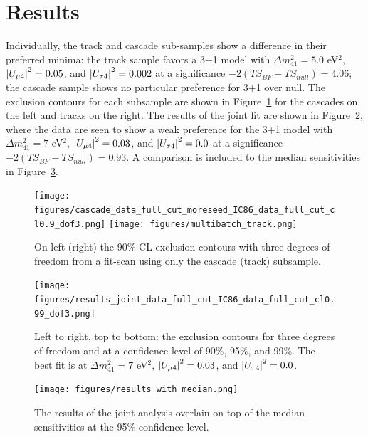 \documentclass[main.tex]{subfiles}
\begin{document}
\section{Results}

Individually, the track and cascade sub-samples show a difference in their preferred minima: the track sample favors a 3+1 model with $\Delta m_{41}^{2}=5.0$ eV$^{2}$, $\left| U_{\mu 4} \right|^{2}=0.05$, and $\left| U_{\tau 4} \right|^{2}=0.002$ at a significance $-2\left(TS_{BF} - TS_{null}\right)=4.06$; the cascade sample shows no particular preference for 3+1 over null.
The exclusion contours for each subsample are shown in Figure~\ref{fig:results_separate} for the cascades on the left and tracks on the right. 
The results of the joint fit are shown in Figure~\ref{fig:final_results}, where the data are seen to show a weak preference for the 3+1 model with $\Delta m_{41}^{2}=7$ eV$^{2}$, $\left| U_{\mu 4} \right|^{2}=0.03$, and $\left| U_{\tau 4} \right|^{2}=0.0$ at a significance $-2\left(TS_{BF} - TS_{null}\right)=0.93$. 
A comparison is included to the median sensitivities in Figure~\ref{fig:final_results_median}.

\begin{figure}
    \centering
    \texttt{[image: figures/cascade\_data\_full\_cut\_moreseed\_IC86\_data\_full\_cut\_cl0.9\_dof3.png]}%
    \texttt{[image: figures/multibatch\_track.png]}
    \caption{On left (right) the 90\% CL exclusion contours with three degrees of freedom from a fit-scan using only the cascade (track) subsample.}\label{fig:results_separate}
\end{figure}

\begin{figure}
    \centering
    \texttt{[image: figures/results\_joint\_data\_full\_cut\_IC86\_data\_full\_cut\_cl0.99\_dof3.png]}
    \caption{Left to right, top to bottom: the exclusion contours for three degrees of freedom and at a confidence level of 90\%, 95\%, and 99\%. The best fit is at $\Delta m_{41}^{2}=7$ eV$^{2}$, $\left| U_{\mu 4} \right|^{2}=0.03$, and $\left| U_{\tau 4} \right|^{2}=0.0$.}\label{fig:final_results}
\end{figure}

\begin{figure}
    \centering
    \texttt{[image: figures/results\_with\_median.png]}
    \caption{The results of the joint analysis overlain on top of the median sensitivities at the 95\% confidence level.}\label{fig:final_results_median}
\end{figure}
\end{document}
